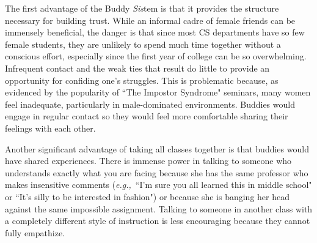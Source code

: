 \documentclass{article}
\newcommand{\eg}{{\em e.g.,}~}
\begin{document}
The first advantage of the Buddy \textit{Sis}tem is that it provides the structure necessary for building trust.
While an informal cadre of female friends can be immensely beneficial, the danger is that since most CS departments have so few female students, they are unlikely to spend much time together without a conscious effort, especially since the first year of college can be so overwhelming.
Infrequent contact and the weak ties that result do little to provide an opportunity for confiding one's struggles.
This is problematic because, as evidenced by the popularity of ``The Impostor Syndrome" seminars, many women feel inadequate, particularly in male-dominated environments.
Buddies would engage in regular contact so they would feel more comfortable sharing their feelings with each other.

Another significant advantage of taking all classes together is that buddies would have shared experiences.
There is immense power in talking to someone who understands exactly what you are facing because she has the same professor who makes insensitive comments (\eg ``I'm sure you all learned this in middle school" or ``It's silly to be interested in fashion") or because she is banging her head against the same impossible assignment.
Talking to someone in another class with a completely different style of instruction is less encouraging because they cannot fully empathize.


\end{document}
